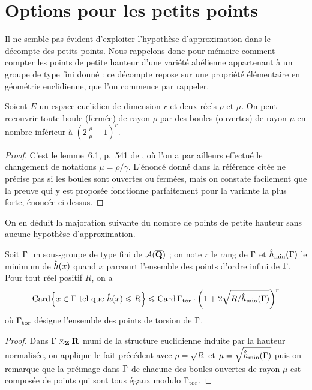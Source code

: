 
\section{Options pour les petits points}
\label{sec:small-points}

Il ne semble pas évident d'exploiter l'hypothèse d'approximation dans le
décompte des petits points. Nous rappelons donc pour mémoire comment
compter les points de petite hauteur d'une variété abélienne appartenant à un
groupe de type fini donné : ce décompte repose sur une propriété élémentaire
en géométrie euclidienne, que l'on commence par rappeler.

\begin{fact}
  Soient \( E \) un espace euclidien de dimension \( r \) et deux réels \(
    \rho \) et \( \mu \). On peut recouvrir toute boule (fermée) de rayon \(
    \rho \) par des boules (ouvertes) de rayon \( \mu \) en nombre inférieur à
  \( ( 2 \, \frac\rho\mu + 1 )^r \).
\end{fact}

\begin{proof}
  C'est le lemme~6.1, p.~541 de \cite{remdcl}, où l'on a par ailleurs effectué
  le changement de notations \( \mu = \rho / \gamma \).  L'énoncé donné dans
  la référence citée ne précise pas si les boules sont ouvertes ou fermées,
  mais on constate facilement que la preuve qui y est proposée fonctionne
  parfaitement pour la variante la plus forte, énoncée ci-dessus.
\end{proof}

On en déduit la majoration suivante du nombre de points de petite hauteur sans
aucune hypothèse d'approximation.

\begin{coro} \label{c:small-va}
  Soit \( \Gamma \) un sous-groupe de type fini de \( \mathcal A(\overline{{\mathbf{Q}}}) \) ; on note
  \( r \) le rang de \( \Gamma \) et \( \hat h_{\mathrm{min}}(\Gamma) \) le minimum de \(
    \hat h (x) \) quand \( x \) parcourt l'ensemble des points d'ordre infini de
  \( \Gamma \).  Pour tout réel positif \( R \), on a
  \begin{equation}
    \card \set*{
      x \in \grp
      \text{ tel que }
      \hautn x \le R
    }
    \le
    \card \grp_\torsion
    \cdot
    \left( 1 + 2\sqrt{R / \hmin(\grp)} \right)^r
  \end{equation}
  où \( \Gamma_{\mathrm{tor}} \) désigne l'ensemble des points de torsion de \( \Gamma
  \).
\end{coro}

\begin{proof}
  Dans \( \Gamma \otimes_{\mathbf{Z}} {\mathbf{R}} \) muni de la structure euclidienne induite par
  la hauteur normalisée, on applique le fait précédent avec \( \rho = \sqrt R
  \) et \( \mu = \sqrt{\hat h_{\mathrm{min}}(\Gamma)} \) puis on remarque que la préimage dans \(
    \Gamma \) de chacune des boules ouvertes de rayon \( \mu \) est composée
  de points qui sont tous égaux modulo \( \Gamma_{\mathrm{tor}} \).
\end{proof}

